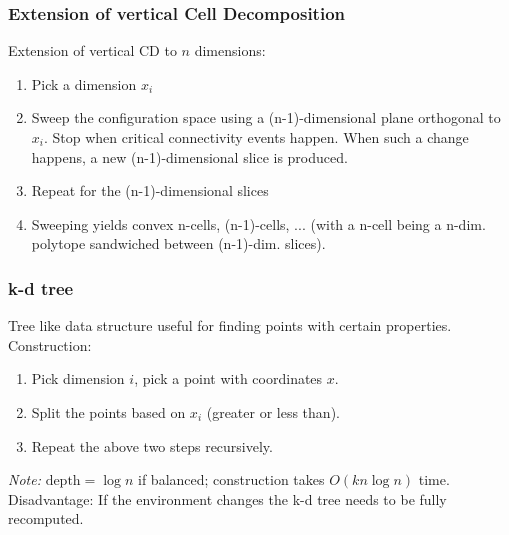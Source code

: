 \begin{multicols*}{2}
\subsubsection{Extension of vertical Cell Decomposition}
Extension of vertical CD to $n$ dimensions:
\begin{enumerate}
	\item Pick a dimension $x_i$
	\item Sweep the configuration space using a (n-1)-dimensional plane orthogonal to $x_i$. Stop when critical connectivity events happen. When such a change happens, a new (n-1)-dimensional slice is produced.
	\item Repeat for the (n-1)-dimensional slices
	\item Sweeping yields convex n-cells, (n-1)-cells, ... (with a n-cell being a n-dim. polytope sandwiched between (n-1)-dim. slices).
\end{enumerate}

\subsubsection{k-d tree}
Tree like data structure useful for finding points with certain properties. Construction:
\begin{enumerate}
	\item Pick dimension $i$, pick a point with coordinates $x$.
	\item Split the points based on $x_i$ (greater or less than).
	\item Repeat the above two steps recursively.
\end{enumerate}
\textit{Note:} $\text{depth} = \log n$ if balanced; construction takes $O(kn \log n)$ time.\\
Disadvantage: If the environment changes the k-d tree needs to be fully recomputed.


\end{multicols*}
